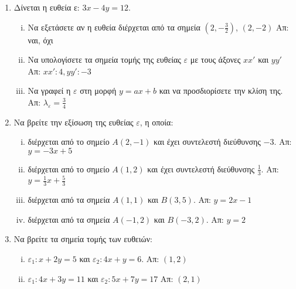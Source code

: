 \documentclass[a4paper,table]{report}
\begin{document}
\begin{center}
  \minibox{\large\bfseries \textcolor{Col1}{Ευθείες}}
\end{center}

\vspace{\baselineskip}

\begin{enumerate}
  \item  Δίνεται η ευθεία ε:  $ 3x - 4y = 12 $.
    \begin{enumerate}[i)]
      \item Να εξετάσετε αν η ευθεία διέρχεται από τα σημεία $\left(2,- \frac{3}{2}
        \right)$, $ (2,-2) $ \hfill Απ:  ναι, όχι 
      \item  Να υπολογίσετε τα σημεία τομής της ευθείας $ \varepsilon $  
        με τους άξονες  $ xx' $  και  $ yy' $ \hfill Απ: $ xx': 4, yy':-3 $ 
      \item Να γραφεί η $ \varepsilon $ στη μορφή $ y=ax+b $ και να 
        προσδιορίσετε την κλίση της. 
        \hfill Απ: $ \lambda_{\varepsilon} = \frac{3}{4} $ 
    \end{enumerate}

  \item  Να βρείτε την εξίσωση της ευθείας  $ \varepsilon $, η οποία: 
    \begin{enumerate}[i)]
      \item διέρχεται από το σημείο  $ A(2,-1) $ και έχει συντελεστή διεύθυνσης 
        $ -3 $.  \hfill Απ: $ y = -3x+5 $ 
      \item διέρχεται από το σημείο  $ A(1,2) $ και έχει συντελεστή διεύθυνσης 
        $ \frac{1}{3} $.  \hfill Απ: $ y = \frac{1}{3} x + \frac{5}{3} $ 
      \item διέρχεται από τα σημεία  $ A(1,1) $  και  $ B(3,5) $. 
        \hfill Απ: $ y=2x-1 $ 
      \item διέρχεται από τα σημεία  $ A(-1,2) $  και  $ B(-3,2) $. 
        \hfill Απ: $ y=2 $ 
    \end{enumerate}

  \item  Να βρείτε τα  σημεία τομής των ευθειών:
    \begin{enumerate}[i)]
      \item $ \varepsilon_{1}: x + 2y = 5 $   και  $\varepsilon_{2}: 4x + y = 6 $.
        \hfill Απ: $ (1,2) $ 
      \item $ \varepsilon_{1}: 4x+3y=11 $ και  $ \varepsilon_{2}: 5x+7y=17 $ 
        \hfill Απ: $ (2,1) $ 
    \end{enumerate}
    

\end{enumerate}
\end{document}
